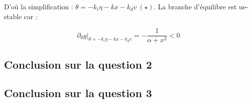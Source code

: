 \documentclass[10pt]{article}
\begin{document}
\noindent D'où la simplification :  $\theta = - k_i \eta - k x - k_d v \ (\star)$. La branche d'équilibre est ue-stable car :

\[
	\partial_{\theta} g |_{\theta = - k_i \eta - k x - k_d v} = - \frac{1}{\alpha + x^2} < 0
\]

\subsection*{Conclusion sur la question 2}


\subsection*{Conclusion sur la question 3}

\end{document}
